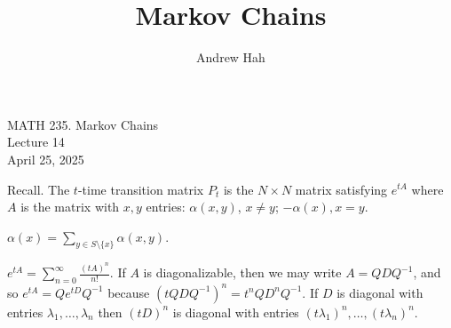 \documentclass[11pt]{article}
\title{Markov Chains}
\author{Andrew Hah}
\begin{document}
\pagestyle{plain}
\begin{center}
{\Large MATH 235. Markov Chains} \\
{\Large Lecture 14} \\
\vspace{.2in}
April 25, 2025
\end{center}

Recall. The $t$-time transition matrix $P_{t}$ is the $N \times N$ matrix satisfying $e^{{tA}}$ where $A$ is the matrix with $x, y$ entries: $\alpha(x, y)$, $x \neq y$; $-\alpha(x), x = y$.

\begin{note}
  $\alpha(x) = \sum_{y \in S \setminus \{ x \}} \alpha(x, y)$.
\end{note}

\begin{note}
  $e^{tA} = \sum_{n = 0}^{\infty} \frac{(tA)^n}{n!}$. If $A$ is diagonalizable, then we may write $A = QDQ^{-1}$, and so $e^{tA} = Qe^{tD}Q^{-1}$ because $(tQDQ^{-1})^n = t^nQD^nQ^{-1}$. If $D$ is diagonal with entries $\lambda_1, \dots, \lambda_n$ then $(tD)^n$ is diagonal with entries $(t\lambda_1)^n, \dots, (t \lambda_n)^{n}$.
\end{note}
\end{document}
